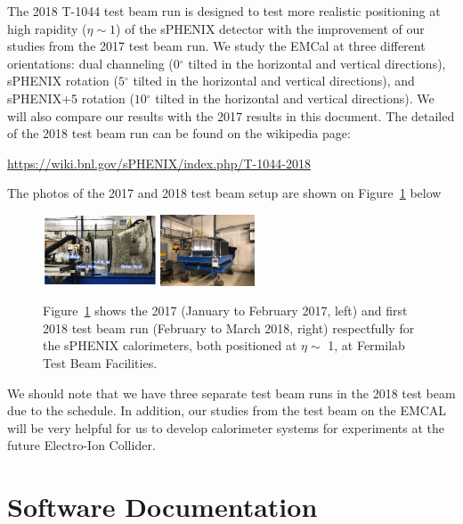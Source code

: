 \documentclass[hidelinks,11pt]{article}
\numberwithin{figure}{section}
\numberwithin{table}{section}
\newcommand{\degree}{\mbox{$^\circ$}\xspace}
\begin{document}
The 2018 T-1044 test beam run is designed to test more realistic positioning at high rapidity ($\eta \sim 1$) of the sPHENIX detector with the improvement of our studies from the 2017 test beam run. We study the EMCal at three different orientations: dual channeling ($0 \degree$ tilted in the horizontal and vertical directions), sPHENIX rotation ($5 \degree$ tilted in the horizontal and vertical directions), and sPHENIX+5 rotation ($10 \degree$ tilted in the horizontal and vertical directions). We will also compare our results with the 2017 results in this document. The detailed of the 2018 test beam run can be found on the wikipedia page: 

\url{https://wiki.bnl.gov/sPHENIX/index.php/T-1044-2018}



The photos of the 2017 and 2018 test beam setup are shown on Figure~\ref{fig:TestBeam} below

\begin{figure}[hbtp]
\begin{center}
\includegraphics[width=0.30\textwidth]{Plots/TestBeamPhotos/2017TestBeamSetup.png}
\includegraphics[width=0.25\textwidth]{Plots/TestBeamPhotos/2018TestBeamSetup.png}
\caption{Figure~\ref{fig:TestBeam} shows the 2017 (January to February 2017, left) and first 2018 test beam run (February to March 2018, right) respectfully for the sPHENIX calorimeters, both positioned at $\eta \sim$ 1, at Fermilab Test Beam Facilities.}
\label{fig:TestBeam}
\end{center}
\end{figure} 


We should note that we have three separate test beam runs in the 2018 test beam due to the schedule. In addition, our studies from the test beam on the EMCAL will be very helpful for us to develop calorimeter systems for experiments at the future Electro-Ion Collider. 


\section{Software Documentation}
\end{document}
